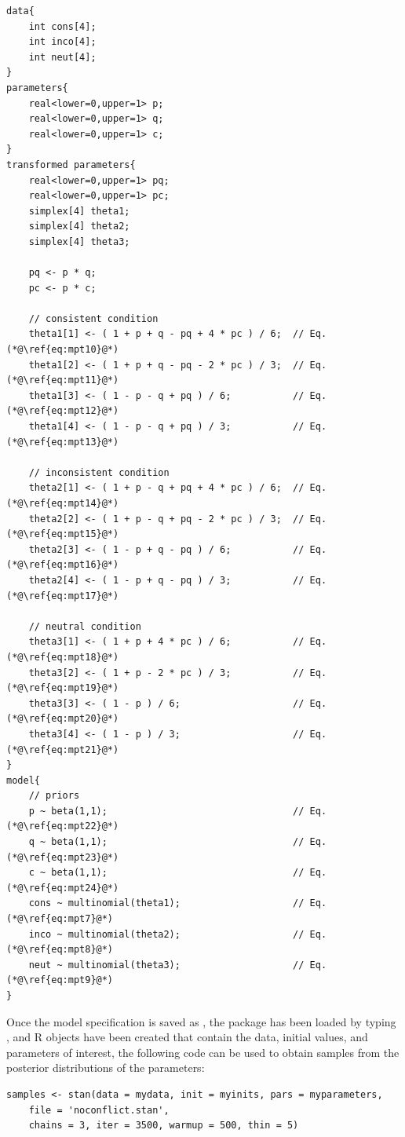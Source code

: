 \begin{lstlisting}
data{
    int cons[4];
    int inco[4];
    int neut[4];
}
parameters{
    real<lower=0,upper=1> p;
    real<lower=0,upper=1> q;
    real<lower=0,upper=1> c;
}
transformed parameters{
    real<lower=0,upper=1> pq;
    real<lower=0,upper=1> pc;
    simplex[4] theta1;
    simplex[4] theta2;
    simplex[4] theta3;

    pq <- p * q;
    pc <- p * c;

    // consistent condition
    theta1[1] <- ( 1 + p + q - pq + 4 * pc ) / 6;  // Eq. (*@\ref{eq:mpt10}@*)
    theta1[2] <- ( 1 + p + q - pq - 2 * pc ) / 3;  // Eq. (*@\ref{eq:mpt11}@*)
    theta1[3] <- ( 1 - p - q + pq ) / 6;           // Eq. (*@\ref{eq:mpt12}@*)
    theta1[4] <- ( 1 - p - q + pq ) / 3;           // Eq. (*@\ref{eq:mpt13}@*)
	
    // inconsistent condition
    theta2[1] <- ( 1 + p - q + pq + 4 * pc ) / 6;  // Eq. (*@\ref{eq:mpt14}@*)
    theta2[2] <- ( 1 + p - q + pq - 2 * pc ) / 3;  // Eq. (*@\ref{eq:mpt15}@*)
    theta2[3] <- ( 1 - p + q - pq ) / 6;           // Eq. (*@\ref{eq:mpt16}@*)
    theta2[4] <- ( 1 - p + q - pq ) / 3;           // Eq. (*@\ref{eq:mpt17}@*)
	
    // neutral condition
    theta3[1] <- ( 1 + p + 4 * pc ) / 6;           // Eq. (*@\ref{eq:mpt18}@*)
    theta3[2] <- ( 1 + p - 2 * pc ) / 3;           // Eq. (*@\ref{eq:mpt19}@*)
    theta3[3] <- ( 1 - p ) / 6;                    // Eq. (*@\ref{eq:mpt20}@*)
    theta3[4] <- ( 1 - p ) / 3;                    // Eq. (*@\ref{eq:mpt21}@*)
}
model{
    // priors
    p ~ beta(1,1);                                 // Eq. (*@\ref{eq:mpt22}@*)
    q ~ beta(1,1);                                 // Eq. (*@\ref{eq:mpt23}@*)
    c ~ beta(1,1);                                 // Eq. (*@\ref{eq:mpt24}@*)
    cons ~ multinomial(theta1);                    // Eq. (*@\ref{eq:mpt7}@*)
    inco ~ multinomial(theta2);                    // Eq. (*@\ref{eq:mpt8}@*)
    neut ~ multinomial(theta3);                    // Eq. (*@\ref{eq:mpt9}@*)
}
\end{lstlisting}

Once the model specification is saved as , the  package has been loaded by typing , and R objects have been created that contain the data, initial values, and parameters of interest, the following code can be used to obtain samples from the posterior distributions of the parameters:

\begin{lstlisting}
samples <- stan(data = mydata, init = myinits, pars = myparameters,
	file = 'noconflict.stan',
	chains = 3, iter = 3500, warmup = 500, thin = 5)
\end{lstlisting}

